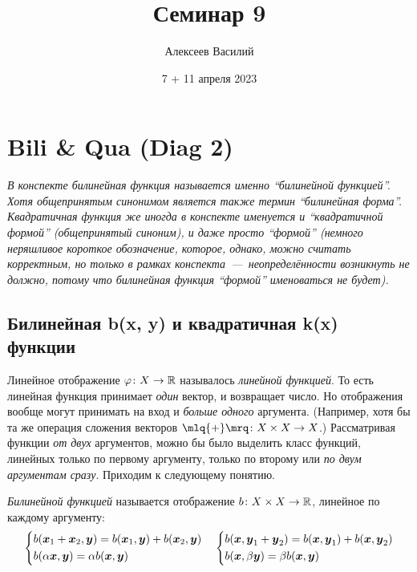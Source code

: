 \documentclass[a4paper,12pt]{article}
\author{Алексеев Василий}
\title{Семинар 9}
\date{7 + 11 апреля 2023}
\begin{document}
  \maketitle
  
  \tableofcontents

  \thispagestyle{empty}
  
  \newpage
  


  \section{Bili \& Qua (Diag 2)}
  
  \emph{
    В конспекте билинейная функция называется именно ``билинейной функцией''.
    Хотя общепринятым синонимом является также термин ``билинейная форма''.
    Квадратичная функция же иногда в конспекте именуется и ``квадратичной формой'' (общепринятый синоним), и даже просто ``формой'' (немного неряшливое короткое обозначение, которое, однако, можно считать корректным, но только в рамках конспекта~---~неопределённости возникнуть не должно, потому что билинейная функция ``формой'' именоваться не будет).
  }
  
  \subsection{Билинейная b(x, y) и квадратичная k(x) функции}
  
  Линейное отображение $\phi\colon X \hm\to \RR$ называлось \emph{линейной функцией}.
  То есть линейная функция принимает \emph{один} вектор, и возвращает число.
  Но отображения вообще могут принимать на вход и \emph{больше одного} аргумента.
  (Например, хотя бы та же операция сложения векторов $\mlq{+}\mrq\colon X \hm\times X \hm\to X$.)
  Рассматривая функции \emph{от двух} аргументов, можно бы было выделить класс функций, линейных только по первому аргументу, только по второму или \emph{по двум аргументам сразу}.
  Приходим к следующему понятию.
  
  \begin{definition}
    \emph{Билинейной функцией} называется отображение $b\colon X \hm\times X \hm\to \RR$, линейное по каждому аргументу:
    \[
      \left\{
        \begin{aligned}
          &b(\boldsymbol x_1 + \boldsymbol x_2, \boldsymbol y) = b(\boldsymbol x_1, \boldsymbol y) + b(\boldsymbol x_2, \boldsymbol y)\\
          &b(\alpha \boldsymbol x, \boldsymbol y) = \alpha b(\boldsymbol x, \boldsymbol y)
        \end{aligned}
      \right.
      \quad \left\{
        \begin{aligned}
          &b(\boldsymbol x, \boldsymbol y_1 + \boldsymbol y_2) = b(\boldsymbol x, \boldsymbol y_1) + b(\boldsymbol x, \boldsymbol y_2)\\
          &b(\boldsymbol x, \beta \boldsymbol y) = \beta b(\boldsymbol x, \boldsymbol y)
        \end{aligned}
      \right.
    \]
  \end{definition}
  
\end{document}

